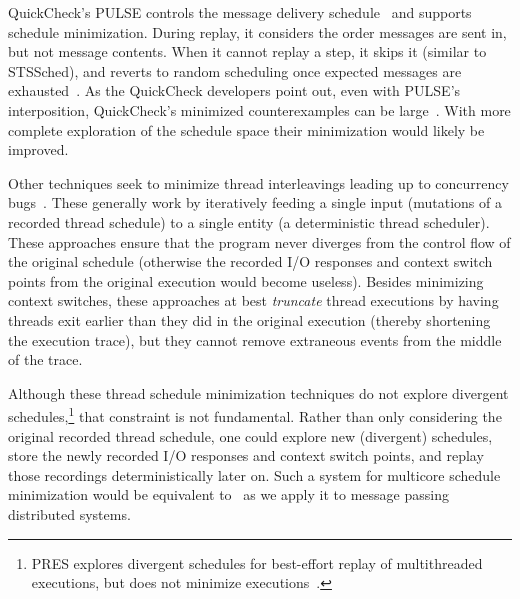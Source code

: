 
QuickCheck's PULSE controls the message delivery
schedule~\cite{claessen2009finding} and supports schedule minimization. During replay, it considers the
order messages are sent in, but not message contents.
When it cannot replay a step, it skips it (similar to
STSSched), and reverts to random scheduling once expected messages
are exhausted~\cite{hughes_email}. As the QuickCheck developers point
out, even with PULSE's interposition, QuickCheck's minimized counterexamples can be
large~\cite{pulse_counterexamples}. With more complete exploration of the
schedule space their minimization would likely be improved.

 Other techniques seek to minimize thread
interleavings leading up to concurrency
bugs~\cite{choi2002isolating,jalbert2010trace,huang2011efficient,el2014efficient}.
These generally work by iteratively feeding a single input (mutations of a
recorded thread schedule) to a single entity (a deterministic thread scheduler). These approaches
ensure that the program never diverges from the control flow of the
original schedule (otherwise the recorded I/O responses and context switch points
from the original execution would become useless). Besides minimizing context
switches, these approaches at
best {\em truncate} thread executions by having threads exit earlier than they did in the original
execution (thereby shortening the execution trace), but they cannot remove extraneous events from
the middle of the trace.

Although these thread schedule minimization techniques do not
explore divergent schedules,\footnote{PRES
explores divergent schedules for best-effort replay of multithreaded
executions, but does not minimize executions~\cite{park2009pres}.}
 that constraint is not fundamental. Rather than
only considering the original recorded thread schedule, one
could explore new (divergent) schedules, store the newly recorded
I/O responses and context switch points, and replay those recordings
deterministically later on. Such a system
for multicore schedule minimization would be equivalent to \sys~as we apply it to message passing
distributed systems.

